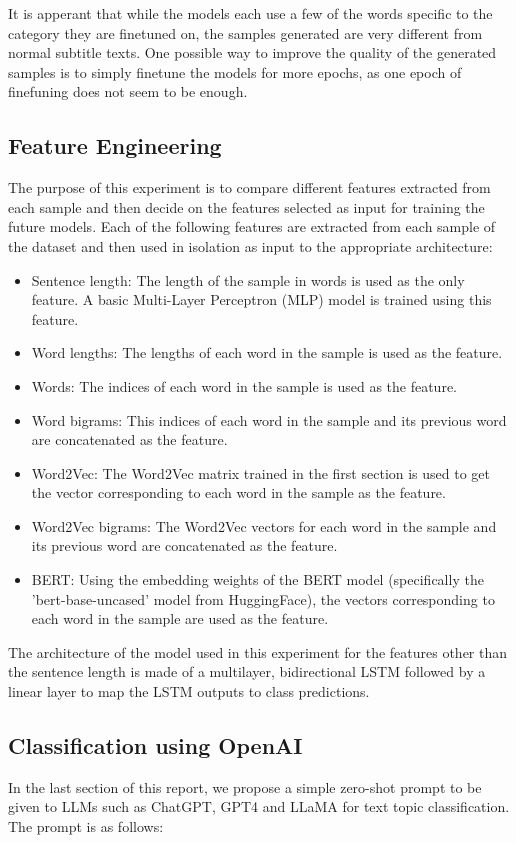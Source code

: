 \documentclass{article}
\begin{document}
It is apperant that while the models each use a few of the words specific to the category they are finetuned on, the samples generated are very different from normal subtitle texts.
One possible way to improve the quality of the generated samples is to simply finetune the models for more epochs, as one epoch of finefuning does not seem to be enough.

\subsection{Feature Engineering}
The purpose of this experiment is to compare different features extracted from each sample and then decide on the features selected as input for training the future models.
Each of the following features are extracted from each sample of the dataset and then used in isolation as input to the appropriate architecture:

\begin{itemize}
  \item Sentence length: The length of the sample in words is used as the only feature.
    A basic Multi-Layer Perceptron (MLP) model is trained using this feature.
  \item Word lengths: The lengths of each word in the sample is used as the feature.
  \item Words: The indices of each word in the sample is used as the feature.
  \item Word bigrams: This indices of each word in the sample and its previous word are concatenated as the feature.
  \item Word2Vec: The Word2Vec matrix trained in the first section is used to get the vector corresponding to each word in the sample as the feature.
  \item Word2Vec bigrams: The Word2Vec vectors for each word in the sample and its previous word are concatenated as the feature.
  \item BERT: Using the embedding weights of the BERT model (specifically the 'bert-base-uncased' model from HuggingFace), the vectors corresponding to each word in the sample are used as the feature.
\end{itemize}

The architecture of the model used in this experiment for the features other than the sentence length is made of a multilayer, bidirectional LSTM followed by a linear layer to map the LSTM outputs to class predictions.

\subsection{Classification using OpenAI}
In the last section of this report, we propose a simple zero-shot prompt to be given to LLMs such as ChatGPT, GPT4 and LLaMA for text topic classification.
The prompt is as follows:

\begin{quote}
  
\end{quote}
\end{document}
